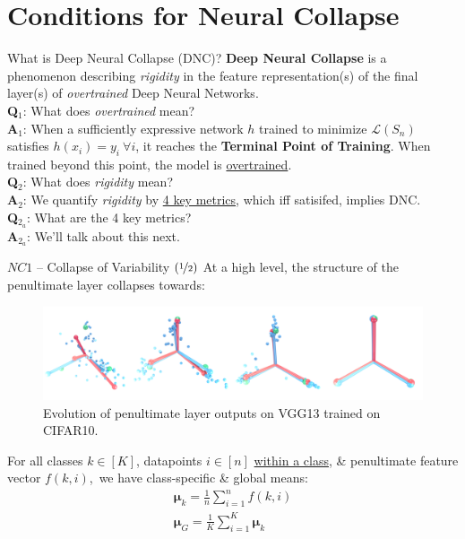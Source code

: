 \documentclass{beamer}
\begin{document}
\section{Conditions for Neural Collapse}
\begin{frame}{What is Deep Neural Collapse (DNC)?}
	\textbf{Deep Neural Collapse} is a phenomenon describing \textit{rigidity} in the feature representation(s) of the final layer(s) of \textit{overtrained} Deep Neural Networks. \pause \newline \\

	\textbf{Q${}_1$}: What does \textit{overtrained} mean? \\
	\textbf{A${}_1$}: When a sufficiently expressive network $h$ trained to minimize $\mathcal{L}(S_n)$ satisfies $h(x_i) = y_i\ \forall i$, it reaches the \textbf{Terminal Point of Training}. When trained beyond this point, the model is  \underline{overtrained}. \pause \newline \\

	\textbf{Q${}_2$}: What does \textit{rigidity} mean? \\
	\textbf{A${}_2$}: We quantify \textit{rigidity} by \underline{4 key metrics}, which iff satisifed, implies DNC. \pause \newline \\

	\textbf{Q${}_{2_a}$}: What are the 4 key metrics? \\
	\textbf{A${}_{2_a}$}: We'll talk about this next.
\end{frame}

\begin{frame}{$NC1$ -- Collapse of Variability $(\nicefrac{1}{2})$}
	At a high level, the structure of the penultimate layer collapses towards:
	\begin{figure}[H]
		\includegraphics[width=\textwidth]{img/nc.png}
		\small Evolution of penultimate layer outputs on VGG13 trained on CIFAR10.
	\end{figure} \pause
	
	For all classes $k \in [K]$, datapoints $i \in [n]$ \underline{within a class}, \& penultimate feature vector $f(k, i)$,\pause~we have class-specific \& global means:
	\begin{gather}
		\bm{\mu}_k = \frac{1}{n} \sum^n_{i=1} f(k, i) \\
		\bm{\mu}_G = \frac{1}{K} \sum^K_{i=1} \bm{\mu}_k
	\end{gather}
\end{frame}
	
\end{document}
